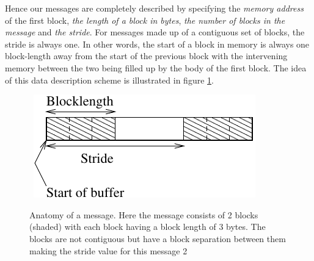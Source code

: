 \begin{itemize}
Hence our messages are completely described by specifying the {\em
memory address} of the first block, {\em the length of a block in
bytes}, {\em the number of blocks in the message} and {\em the
stride}.  For messages made up of a contiguous set of blocks, the
stride is always one. In other words, the start of a block in memory is
always one block-length away from the start of the previous block with the
intervening memory between the two being filled up by the body of
the first block. The idea of this data description scheme is illustrated
in figure \ref{f:message}.
\end{itemize}

\begin{figure}[h]
\begin{center}
\leavevmode
\hbox{
\includegraphics{message}}
\end{center}
\caption{Anatomy of a message. Here the message consists of 2 blocks
(shaded) with each block having a block length of 3 bytes. The blocks
are not contiguous but have a block separation between them making the
stride value for this message 2}
\label{f:message}
\end{figure}

